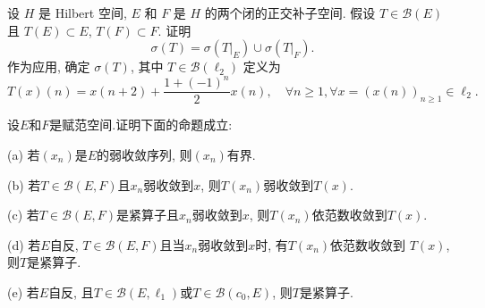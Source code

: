 \begin{exercise}
    设 $H$ 是 Hilbert 空间, $E$ 和 $F$ 是 $H$ 的两个闭的正交补子空间.
    假设 $T\in\mathcal{B}(E)$ 且 $T(E)\subset E$, $T(F)\subset F$. 证明
    \[\sigma(T)=\sigma(T|_E)\cup\sigma(T|_F).\]
    作为应用, 确定 $\sigma(T)$, 其中 $T\in\mathcal{B}(\ell_2)$ 定义为
    \[T(x)(n)=x(n+2)+\frac{1+(-1)^n}{2}x(n),\quad\forall n\geq 1,\forall x=(x(n))_{n\geq 1}\in\ell_2.\]
\end{exercise}



\begin{exercise}
    设$E$和$F$是赋范空间.证明下面的命题成立:

    (a) 若$(x_n)$是$E$的弱收敛序列, 则$(x_n)$有界.

    (b) 若$T\in\mathcal{B}(E,F)$且$x_n$弱收敛到$x$, 则$T(x_n)$弱收敛到$T(x)$.

    (c) 若$T\in\mathcal{B}(E,F)$是紧算子且$x_n$弱收敛到$x$, 则$T(x_n)$依范数收敛到$T(x)$.

    (d) 若$E$自反, $T\in\mathcal{B}(E,F)$且当$x_n$弱收敛到$x$时, 有$T(x_n)$依范数收敛到 $T(x)$, 则$T$是紧算子.

    (e) 若$E$自反, 且$T\in\mathcal{B}(E,\ell_1)$或$T\in\mathcal{B}(c_0,E)$, 则$T$是紧算子. 
\end{exercise}

